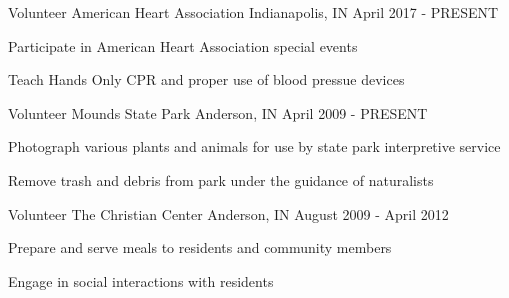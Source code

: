 

\begin{cventries}

  \cventry
    {Volunteer} %
    {American Heart Association} %
    {Indianapolis, IN} %
    {April 2017 - PRESENT} %
    {
      \begin{cvitems} %
        \item {Participate in American Heart Association special events}
        \item {Teach Hands Only CPR and proper use of blood pressue devices}
      \end{cvitems}
    }

  \cventry
    {Volunteer} %
    {Mounds State Park} %
    {Anderson, IN} %
    {April 2009 - PRESENT} %
    {
      \begin{cvitems} %
        \item {Photograph various plants and animals for use by state park interpretive service}
        \item {Remove trash and debris from park under the guidance of naturalists}
      \end{cvitems}
    }

  \cventry
    {Volunteer}
    {The Christian Center}
    {Anderson, IN}
    {August 2009 - April 2012}
    {
      \begin{cvitems}
        \item {Prepare and serve meals to residents and community members}
        \item {Engage in social interactions with residents}
      \end{cvitems}
    }
    

\end{cventries}
